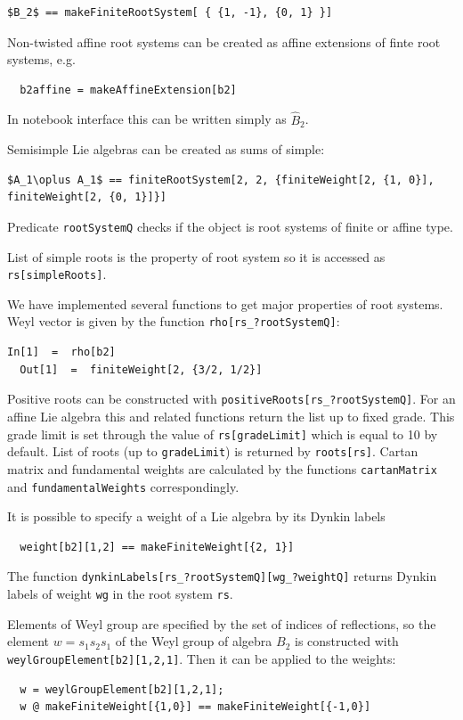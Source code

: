 \begin{lstlisting}[mathescape=true]
  $B_2$ == makeFiniteRootSystem[ { {1, -1}, {0, 1} }]
\end{lstlisting}

Non-twisted affine root systems can be created as affine extensions of finte root systems, e.g.
\begin{lstlisting}
  b2affine = makeAffineExtension[b2]
\end{lstlisting}
In notebook interface this can be written simply as $\hat{B}_2$.

Semisimple Lie algebras can be created as sums of simple:
\begin{lstlisting}[mathescape=true]
  $A_1\oplus A_1$ == finiteRootSystem[2, 2, {finiteWeight[2, {1, 0}], finiteWeight[2, {0, 1}]}]
\end{lstlisting}

Predicate \lstinline{rootSystemQ} checks if the object is root systems of finite or affine type.

List of simple roots is the property of root system so it is accessed as \lstinline{rs[simpleRoots]}.

We have implemented several functions to get major properties of root systems. Weyl vector is given by the function \lstinline{rho[rs_?rootSystemQ]}:
\begin{lstlisting}[label=list:1]
  In[1]  =  rho[b2]
  Out[1]  =  finiteWeight[2, {3/2, 1/2}]
\end{lstlisting}
Positive roots can be constructed with \lstinline{positiveRoots[rs_?rootSystemQ]}. For an affine Lie algebra this and related functions return the list up to fixed grade. This grade limit is set through the value of \lstinline{rs[gradeLimit]} which is equal to 10 by default. List of roots (up to \lstinline{gradeLimit}) is returned by \lstinline{roots[rs]}. Cartan matrix and fundamental weights are calculated by the functions \lstinline{cartanMatrix} and \lstinline{fundamentalWeights} correspondingly.

It is possible to specify a weight of a Lie algebra by its Dynkin labels
\begin{lstlisting}
  weight[b2][1,2] == makeFiniteWeight[{2, 1}]
\end{lstlisting}
The function \lstinline{dynkinLabels[rs_?rootSystemQ][wg_?weightQ]} returns Dynkin labels of weight \lstinline{wg} in the root system \lstinline{rs}.

Elements of Weyl group are specified by the set of indices of reflections, so the element  $w=s_{1}s_{2}s_{1}$ of the Weyl group of algebra $B_{2}$ is constructed with \lstinline{weylGroupElement[b2][1,2,1]}. Then it can be applied to the weights:
\begin{lstlisting}
  w = weylGroupElement[b2][1,2,1];
  w @ makeFiniteWeight[{1,0}] == makeFiniteWeight[{-1,0}]
\end{lstlisting}

